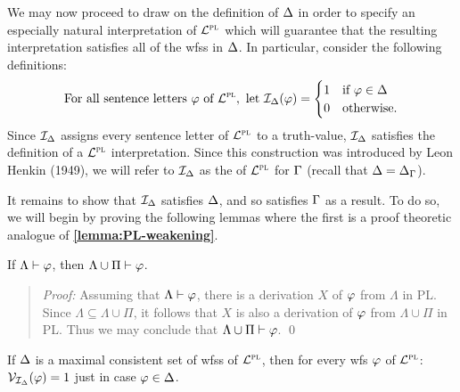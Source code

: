 We may now proceed to draw on the definition of $\Delta$ in order to specify an especially natural interpretation of $\mathcal{L}^{\textsc{pl}}$ which will guarantee that the resulting interpretation satisfies all of the wfss in $\Delta$.
In particular, consider the following definitions:
  \[
    \text{For all sentence letters } \varphi \text{ of } \mathcal{L}^{\textsc{pl}}, \text{ let } \mathcal{I}_{\Delta}(\varphi) = 
      \begin{cases}
        1 & \text{if } \varphi \in \Delta\\
        0 & \text{otherwise.}
      \end{cases}
  \]
Since $\mathcal{I}_{\Delta}$ assigns every sentence letter of $\mathcal{L}^{\textsc{pl}}$ to a truth-value, $\mathcal{I}_{\Delta}$ satisfies the definition of a $\mathcal{L}^{\textsc{pl}}$ interpretation.
Since this construction was introduced by Leon Henkin (1949), we will refer to $\mathcal{I}_{\Delta}$ as the  of $\mathcal{L}^{\textsc{pl}}$ for $\Gamma$ (recall that $\Delta=\Delta_{\Gamma}$).

It remains to show that $\mathcal{I}_{\Delta}$ satisfies $\Delta$, and so satisfies $\Gamma$ as a result.
To do so, we will begin by proving the following lemmas where the first is a proof theoretic analogue of \textbf{\ref{lemma:PL-weakening}}.





\begin{Lthm} \label{lemma:PL-prweak}
  If $\Lambda\vdash\varphi$, then $\Lambda\cup\Pi\vdash\varphi$.
\end{Lthm} \vspace{-.2in}

\begin{quote} 
  \textit{Proof:} 
  Assuming that $\Lambda\vdash\varphi$, there is a derivation $X$ of $\varphi$ from $\Lambda$ in PL.
  Since $\Lambda\subseteq\Lambda\cup\Pi$, it follows that $X$ is also a derivation of $\varphi$ from $\Lambda\cup\Pi$ in PL.
  Thus we may conclude that $\Lambda\cup\Pi\vdash\varphi$. 
  \qed
\end{quote}







\begin{Lthm} \label{lemma:PL-truth}
  If $\Delta$ is a maximal consistent set of wfss of $\mathcal{L}^{\textsc{pl}}$, then for every wfs $\varphi$ of $\mathcal{L}^{\textsc{pl}}$: $\mathcal{V}_{\mathcal{I}_{\Delta}}(\varphi) = 1$ just in case $\varphi\in\Delta$.  
\end{Lthm} \vspace{-.2in}

